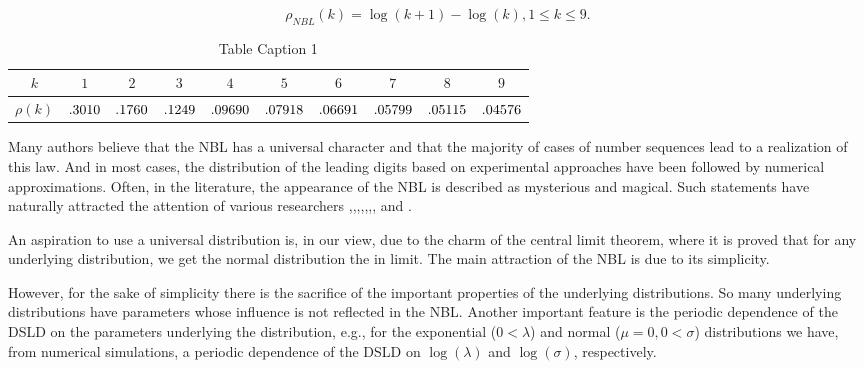 \documentclass[titlepage,fleqn]{article}%
\begin{document}
\begin{equation}
\rho_{NBL}(k)=\log(k+1)-\log(k),1\leq k\leq9. \label{BF_Distr}%
\end{equation}
\medskip%

\begin{table}[!htbp] \centering
\begin{tabular}
[c]{|c|c|c|c|c|c|c|c|c|c|}\hline\hline
$k$ & $1$ & $2$ & $3$ & $4$ & $5$ & $6$ & $7$ & $8$ & $9$\\\hline
$\rho(k)$ & ${\small .3010}$ & .${\small 1760}$ & ${\small .1249}$ &
${\small .09690}$ & ${\small .07918}$ & ${\small .06691}$ & ${\small .05799}$
& ${\small .05115}$ & ${\small .04576}$\\\hline\hline
\end{tabular}
\bigskip\caption{Table Caption 1}\label{TableKey1}%
\end{table}%


Many authors believe that the NBL has a universal character and that the
majority of cases of number sequences lead to a realization of this law. And
in most cases, the distribution of the leading digits based on experimental
approaches have been followed by numerical approximations. Often, in the
literature, the appearance of the NBL is described as mysterious and magical.
Such statements have naturally attracted the attention of various researchers
\cite{diaconis},\cite{raimi},\cite{nigrini1},\cite{arnold0},\cite
{arnold1},\cite{bergerhill},\cite{nigrini},\cite{arnotheodore} and \cite
{miller}%
.

An aspiration to use a universal distribution is, in our view, due to the
charm of the central limit theorem, where it is proved that for any underlying
distribution, we get the normal distribution the in limit. The main attraction
of the NBL is due to its simplicity.

However, for the sake of simplicity there is the sacrifice of the important
properties of the underlying distributions. So many underlying distributions
have parameters whose influence is not reflected in the NBL. Another important
feature is the periodic dependence of the DSLD on the parameters underlying
the distribution, e.g., for the exponential ($0<\lambda$) and normal
($\mu=0,0<\sigma$) distributions we have, from numerical simulations, a
periodic dependence of the DSLD on $\log(\lambda)$ and $\log(\sigma)$, respectively.
\end{document}
